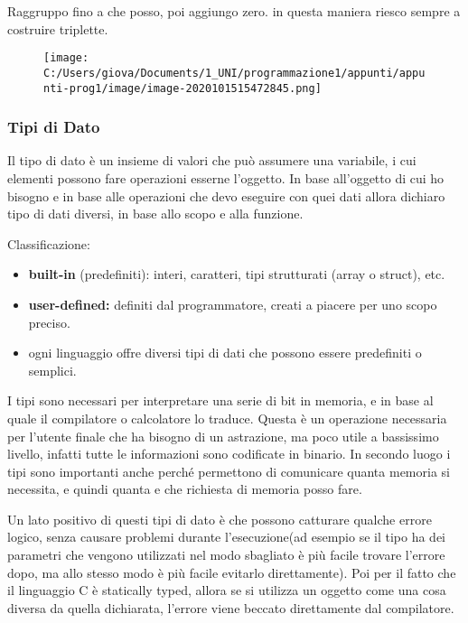 \documentclass[
]{article}
\begin{document}
Raggruppo fino a che posso, poi aggiungo zero. in questa maniera riesco
sempre a costruire triplette.

\begin{figure}
\centering
\texttt{[image: C:/Users/giova/Documents/1\_UNI/programmazione1/appunti/appunti-prog1/image/image-2020101515472845.png]}
\caption{}
\end{figure}

\hypertarget{header-n525}{%
\subsubsection{Tipi di Dato}\label{header-n525}}

Il tipo di dato è un insieme di valori che può assumere una variabile, i
cui elementi possono fare operazioni esserne l'oggetto. In base
all'oggetto di cui ho bisogno e in base alle operazioni che devo
eseguire con quei dati allora dichiaro tipo di dati diversi, in base
allo scopo e alla funzione.

Classificazione:

\begin{itemize}
\item
  \textbf{built-in} (predefiniti): interi, caratteri, tipi strutturati
  (array o struct), etc.
\item
  \textbf{user-defined: }definiti dal programmatore, creati a piacere
  per uno scopo preciso.
\item
  ogni linguaggio offre diversi tipi di dati che possono essere
  predefiniti o semplici.
\end{itemize}

I tipi sono necessari per interpretare una serie di bit in memoria, e in
base al quale il compilatore o calcolatore lo traduce. Questa è un
operazione necessaria per l'utente finale che ha bisogno di un
astrazione, ma poco utile a bassissimo livello, infatti tutte le
informazioni sono codificate in binario. In secondo luogo i tipi sono
importanti anche perché permettono di comunicare quanta memoria si
necessita, e quindi quanta e che richiesta di memoria posso fare.

Un lato positivo di questi tipi di dato è che possono catturare qualche
errore logico, senza causare problemi durante l'esecuzione(ad esempio se
il tipo ha dei parametri che vengono utilizzati nel modo sbagliato è più
facile trovare l'errore dopo, ma allo stesso modo è più facile evitarlo
direttamente). Poi per il fatto che il linguaggio C è statically typed,
allora se si utilizza un oggetto come una cosa diversa da quella
dichiarata, l'errore viene beccato direttamente dal compilatore.
\end{document}
